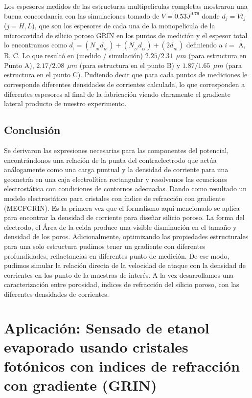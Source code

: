 \documentclass[a4paper,11pt,]{book}
\begin{document}
Los espesores medidos de las estructuras multipeliculas completas mostraron una buena concordancia con las  simulaciones tomado de $V=0.53J^{0.79}$ donde $d_j=Vt_j$ ($j=H,L$), que son los espesores de cada una de la monopelicula de la microcavidad de silicio poroso GRIN en los puntos de medición y el espesor total  lo encontramos como  $d_{_{i}} = (N_{_{Hi}}d_{_{Hi}})+(N_{_{Li}}d_{_{Li}}) + (2d_{_{Hi}})$  definiendo a $i=$ A, B, C. Lo que resultó en (medido / simulación) $2.25 / 2.31 \ \ \mu m $ (para estructura en Punto A), $2.17 / 2.08 \ \ \mu m $ (para estructura en el punto B) y $1.87 / 1.65 \ \ \mu m $ (para estructura  en el punto C). Pudiendo decir que para cada puntos de mediciones le corresponde diferentes densidades de corrientes calculada, lo que corresponden a diferentes espesores al final de la fabricación viendo claramente el gradiente lateral producto de nuestro experimento.
\section{Conclusión}
Se derivaron las expresiones necesarias para las componentes del potencial, encontrándonos una relación de la punta del contraelectrodo que actúa análogamente como una carga puntual y la densidad de corriente para una geometría en una caja electrolítica rectangular y resolvemos las ecuaciones electrostática con condiciones de contornos adecuadas. Dando como resultado un modelo electrostático para cristales con índice de refracción con gradiente (MECFGRIN).
Es la primera vez que el formalismo aquí mencionado se aplica para encontrar la densidad de corriente para diseñar silicio poroso. La forma del electrodo, el Área de la celda  produce una visible disminución en el tamaño y densidad de los poros. Adicionalmente,  optimizando las propiedades estructurales para una solo estructura pudimos tener un gradiente con diferentes profundidades, reflactancias en diferentes  punto de medición. De ese modo, pudimos simular la relación directa de la velocidad de ataque con la densidad de corrientes en los punto de la muestras de interés. A la vez desarrollamos una caracterización entre porosidad, índices de refracción del silicio poroso, con las diferentes densidades de corrientes.


\chapter{Aplicación: Sensado de etanol evaporado usando cristales fotónicos con indices de refracción con gradiente (GRIN)}
\label{Mo:SENSADO}
\end{document}
